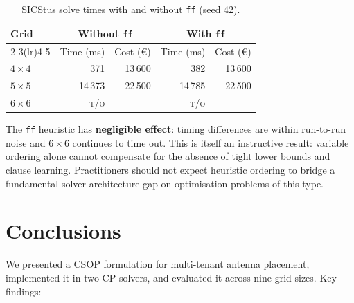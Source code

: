 \documentclass{llncs}
\begin{document}
\begin{table}[H]
\centering
\caption{SICStus solve times with and without \texttt{ff} (seed 42).}
\label{tab:ff}
\begin{tabular}{lrrrr}
\toprule
\textbf{Grid} & \multicolumn{2}{c}{\textbf{Without \texttt{ff}}} &
                \multicolumn{2}{c}{\textbf{With \texttt{ff}}} \\
\cmidrule(lr){2-3}\cmidrule(lr){4-5}
& Time (ms) & Cost (€) & Time (ms) & Cost (€) \\
\midrule
$4{\times}4$ &       371 & 13\,600 &       382 & 13\,600 \\
$5{\times}5$ &    14\,373 & 22\,500 &    14\,785 & 22\,500 \\
$6{\times}6$ & \textsc{t/o} & --- & \textsc{t/o} & --- \\
\bottomrule
\end{tabular}
\end{table}

The \texttt{ff} heuristic has \textbf{negligible effect}: timing differences
are within run-to-run noise and $6{\times}6$ continues to time out.
This is itself an instructive result: variable ordering alone cannot compensate
for the absence of tight lower bounds and clause learning. Practitioners should
not expect heuristic ordering to bridge a fundamental solver-architecture gap
on optimisation problems of this type.


\section{Conclusions}
\label{sec:conclusions}

We presented a CSOP formulation for multi-tenant antenna placement, implemented
it in two CP solvers, and evaluated it across nine grid sizes. Key findings:
\end{document}
